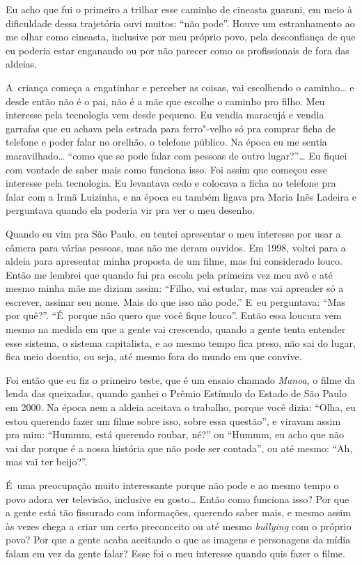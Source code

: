 \noindent Eu acho que fui o primeiro a trilhar esse caminho de cineasta guarani,
em meio à dificuldade dessa trajetória ouvi muitos: ``não pode''. Houve
um estranhamento ao me olhar como cineasta, inclusive por meu próprio
povo, pela desconfiança de que eu poderia estar enganando ou por não
parecer como os profissionais de fora das aldeias.

A~criança começa a engatinhar e perceber as coisas, vai escolhendo o
caminho\ldots{} e desde então não é o pai, não é a mãe que escolhe o caminho
pro filho. Meu interesse pela tecnologia vem desde pequeno. Eu vendia
maracujá e vendia garrafas que eu achava pela estrada para ferro"-velho
só pra comprar ficha de telefone e poder falar no orelhão, o telefone
público. Na época eu me sentia maravilhado\ldots{} ``como que se pode falar
com pessoas de outro lugar?''\ldots{} Eu fiquei com vontade de saber mais
como funciona isso. Foi assim que começou esse interesse pela
tecnologia. Eu levantava cedo e colocava a ficha no telefone pra falar
com a Irmã Luizinha, e na época eu também ligava pra Maria Inês Ladeira
e perguntava quando ela poderia vir pra ver o meu desenho. 

Quando eu vim pra São Paulo, eu tentei apresentar o meu interesse por
usar a câmera para várias pessoas, mas não me deram ouvidos. Em 1998,
voltei para a aldeia para apresentar minha proposta de um filme, mas
fui considerado louco. Então me lembrei que quando fui pra escola pela
primeira vez meu avô e até mesmo minha mãe me diziam assim: ``Filho, vai
estudar, mas vai aprender só a escrever, assinar seu nome. Mais do que
isso não pode.'' E~eu perguntava: ``Mas por quê?''. ``É~porque não quero
que você fique louco''. Então essa loucura vem mesmo na medida em que a
gente vai crescendo, quando a gente tenta entender esse sistema, o
sistema capitalista, e ao mesmo tempo fica preso, não sai do lugar,
fica meio doentio, ou seja, até mesmo fora do mundo em que convive. 

Foi então que eu fiz o primeiro teste, que é um ensaio chamado \emph{Manoa}, o
filme da lenda das queixadas, quando ganhei o Prêmio Estímulo do Estado
de São Paulo em 2000. Na época nem a aldeia aceitava o trabalho, porque
você dizia: ``Olha, eu estou querendo fazer um filme sobre isso, sobre
essa questão'', e viravam assim pra mim: ``Hummm, está querendo roubar,
né?'' ou ``Hummm, eu acho que não vai dar porque é a nossa história que
não pode ser contada'', ou até mesmo: ``Ah, mas vai ter beijo?''.

É~uma preocupação muito interessante porque não pode e ao mesmo tempo o
povo adora ver televisão, inclusive eu gosto\ldots{} Então como funciona
isso? Por que a gente está tão fissurado com informações, querendo
saber mais, e mesmo assim às vezes chega a criar um certo preconceito
ou até mesmo \emph{bullying} com o próprio povo? Por que a gente acaba
aceitando o que as imagens e personagens da mídia falam em vez da gente
falar? Esse foi o meu interesse quando quis fazer o filme.

